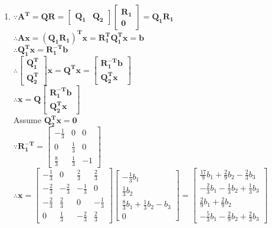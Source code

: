 \documentclass[english,onecolumn]{IEEEtran}
\begin{document}
\begin{enumerate}
    \item
    
    $\because \mathbf{A^T = Q R = }  
    \begin{bmatrix}  \mathbf{Q_1} & \mathbf{Q_2}  \end{bmatrix}  
    \begin{bmatrix}  \mathbf{R_1} \\ \mathbf{0}  \end{bmatrix} = \mathbf{Q_1 R_1} $\\
    $\therefore 
    \mathbf{A x = (Q_1 R_1)^T x = R_1^T Q_1^T x  = b  }
    $\\
    $ \therefore \mathbf{Q_1^T x = R_1^{-T} b} $\\
    $\therefore 
    \begin{bmatrix}  \mathbf{Q_1^T} \\ \mathbf{Q_2^T}  \end{bmatrix} 
    \mathbf{x = Q^T x} = \begin{bmatrix}  
    \mathbf{R_1^{-T} b} \\
    \mathbf{Q_2^T x }  
    \end{bmatrix} $\\
    $\therefore \mathbf{x} = \mathbf{Q}  \begin{bmatrix}  \mathbf{R_1^{-T} b} \\ \mathbf{Q_2^T x }  \end{bmatrix}$\\
    Assume $\mathbf{Q_2^T x } = \mathbf{0}    $\\
    $\because    \mathbf{R_1^{-T}} = 
    \begin{bmatrix}
        -\frac{1}{3} & 0 & 0  \\
        0 & \frac{1}{3} & 0 \\
        \frac{8}{3} & \frac{1}{3} & -1 
    \end{bmatrix} $\\
    $\therefore   \mathbf{x} = 
    \begin{bmatrix}
        -\frac{1}{3} & 0 & \frac{2}{3} & \frac{2}{3} \\
        -\frac{2}{3} & -\frac{2}{3} & -\frac{1}{3} & 0 \\
        -\frac{2}{3} & \frac{2}{3} & 0 & -\frac{1}{3} \\
        0 & \frac{1}{3} & -\frac{2}{3} & \frac{2}{3}
    \end{bmatrix}
    \begin{bmatrix}  
    -\frac{1}{3} b_1 \\ 
    \frac{1}{3} b_2 \\
    \frac{8}{3} b_1 + \frac{1}{3} b_2 - b_3\\
    0
    \end{bmatrix} = 
    \begin{bmatrix}  
    \frac{17}{9} b_1 + \frac{2}{9} b_2 -\frac{2}{3} b_3 \\ 
    -\frac{2}{3} b_1 - \frac{1}{3} b_2 + \frac{1}{3} b_3 \\
    \frac{2}{9} b_1 + \frac{2}{9} b_2 \\
    -\frac{5}{3} b_1 - \frac{2}{9} b_2 + \frac{2}{3} b_3
    \end{bmatrix}
    $\\
    

\end{enumerate}
\end{document}
